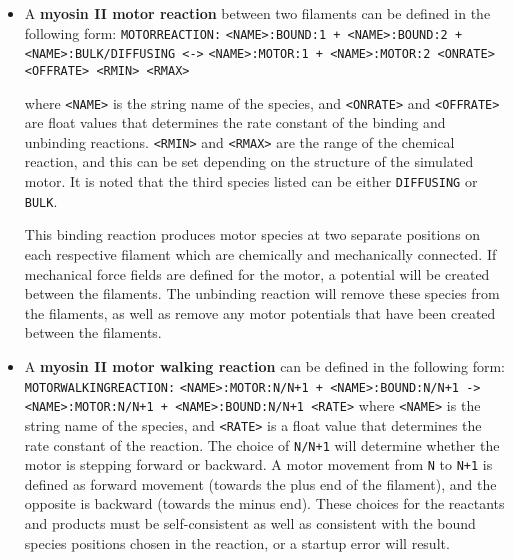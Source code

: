 \documentclass[11pt, oneside]{article}   	%
\begin{document}
\begin{itemize}
 
 \item A \textbf{myosin II motor reaction} between two filaments can be defined in the following form:\newline\newline
\texttt{MOTORREACTION:}\newline
\texttt{<NAME>:BOUND:1 + <NAME>:BOUND:2 + <NAME>:BULK/DIFFUSING <->}\newline
\texttt{<NAME>:MOTOR:1 + <NAME>:MOTOR:2 <ONRATE> <OFFRATE> <RMIN> <RMAX>}\newline

where \texttt{<NAME>} is the string name of the species, and \texttt{<ONRATE>} and \texttt{<OFFRATE>} are float values that determines the rate constant of the binding and unbinding reactions. \texttt{<RMIN>} and \texttt{<RMAX>} are the range of the chemical reaction, and this can be set depending on the structure of the simulated motor. It is noted that the third species listed can be either \texttt{DIFFUSING} or \texttt{BULK}. 

This binding reaction produces motor species at two separate positions on each respective filament which are chemically and mechanically connected. If mechanical force fields are defined for the motor, a potential will be created between the filaments. The unbinding reaction will remove these species from the filaments, as well as remove any motor potentials that have been created between the filaments.


\item A \textbf{myosin II motor walking reaction} can be defined in the following form:\newline\newline
\texttt{MOTORWALKINGREACTION:}\newline
\texttt{<NAME>:MOTOR:N/N+1 + <NAME>:BOUND:N/N+1 ->}\newline
\texttt{<NAME>:MOTOR:N/N+1 + <NAME>:BOUND:N/N+1 <RATE>}\newline\newline
where \texttt{<NAME>} is the string name of the species, and \texttt{<RATE>} is a float value that determines the rate constant of the reaction. The choice of \texttt{N/N+1} will determine whether the motor is stepping forward or backward. A motor movement from \texttt{N} to \texttt{N+1} is defined as forward movement (towards the plus end of the filament), and the opposite is backward (towards the minus end). These choices for the reactants and products must be self-consistent as well as consistent with the bound species positions chosen in the reaction, or a startup error will result. 


\end{itemize}
\end{document}

